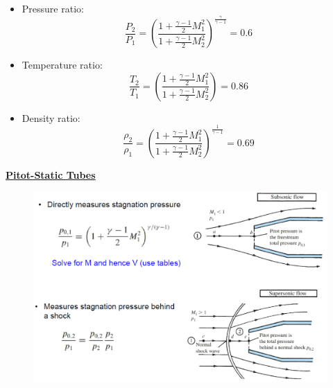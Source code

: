 \begin{itemize}
\begin{itemize}
        \item Pressure ratio:
        \begin{equation*}
            \frac{P_2}{P_1} = \left(\frac{1+\frac{\gamma-1}{2}M_1^2}{1+\frac{\gamma-1}{2}M_2^2}\right)^{\frac{\gamma}{\gamma-1}} = 0.6
        \end{equation*}
        \item Temperature ratio:
        \begin{equation*}
            \frac{T_2}{T_1} = \left(\frac{1+\frac{\gamma-1}{2}M_1^2}{1+\frac{\gamma-1}{2}M_2^2}\right)= 0.86
        \end{equation*}
        \item Density ratio:
        \begin{equation*}
            \frac{\rho_2}{\rho_1} = \left(\frac{1+\frac{\gamma-1}{2}M_1^2}{1+\frac{\gamma-1}{2}M_2^2}\right)^{\frac{1}{\gamma-1}}= 0.69
        \end{equation*}
    \end{itemize}
\end{itemize}

\large \textbf{\underline{{\color{red}Pitot-Static Tubes}}}
\begin{figure}[H]
    \centering
    \includegraphics[width=1.0\linewidth]{images/Pitot_static_tubes.png}
\end{figure}

